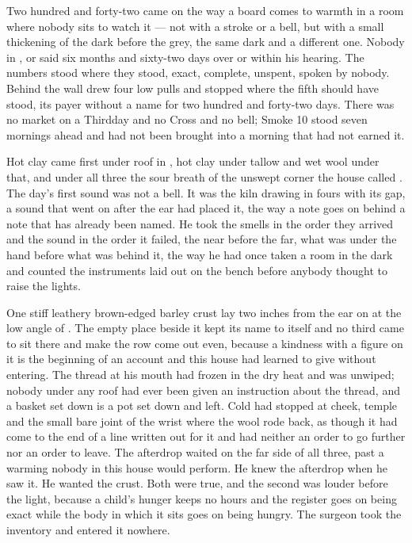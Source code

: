 
Two hundred and forty-two came on the way a board comes to warmth in a room where nobody sits to watch it --- not with a stroke or a bell, but with a small thickening of the dark before the grey, the same dark and a different one. Nobody in ,  or  said six months and sixty-two days over  or within his hearing. The numbers stood where they stood, exact, complete, unspent, spoken by nobody. Behind the wall  drew four low pulls and stopped where the fifth should have stood, its payer without a name for two hundred and forty-two days. There was no market on a Thirdday and no Cross and no bell; Smoke 10 stood seven mornings ahead and had not been brought into a morning that had not earned it.

Hot clay came first under  roof in , hot clay under tallow and wet wool under that, and under all three the sour  breath of the unswept corner the house called . The day's first sound was not a bell. It was the kiln drawing in fours with its gap, a sound that went on after the ear had placed it, the way a note goes on behind a note that has already been named. He took the smells in the order they arrived and the sound in the order it failed, the near before the far, what was under the hand before what was behind it, the way he had once taken a room in the dark and counted the instruments laid out on the bench before anybody thought to raise the lights.

One stiff leathery brown-edged barley crust lay two inches from the ear on  at the low angle of . The empty place beside it kept its name to itself and no third came to sit there and make the row come out even, because a kindness with a figure on it is the beginning of an account and this house had learned to give without entering. The thread at his mouth had frozen in the dry heat and was unwiped; nobody under any roof had ever been given an instruction about the thread, and a basket set down is a pot set down and left. Cold had stopped at cheek, temple and the small bare joint of the wrist where the wool rode back, as though it had come to the end of a line written out for it and had neither an order to go further nor an order to leave. The afterdrop waited on the far side of all three, past a warming nobody in this house would perform. He knew the afterdrop when he saw it. He wanted the crust. Both were true, and the second was louder before the light, because a child's hunger keeps no hours and the register goes on being exact while the body in which it sits goes on being hungry. The surgeon took the inventory and entered it nowhere.

